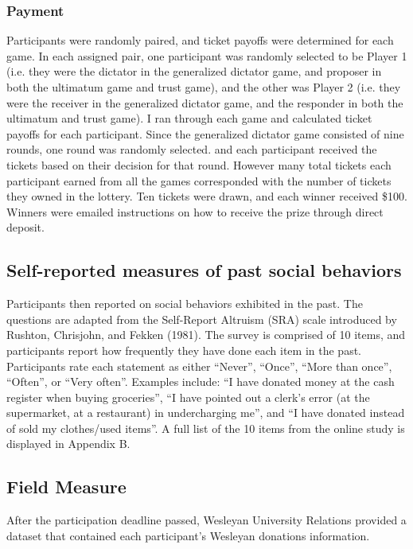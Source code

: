 \documentclass[12pt]{article}
\begin{document}
\subsubsection{Payment}

Participants were randomly paired, and ticket payoffs were determined for each game. In each assigned pair, one participant was randomly selected to be Player 1 (i.e. they were the dictator in the generalized dictator game, and proposer in both the ultimatum game and trust game), and the other was Player 2 (i.e. they were the receiver in the generalized dictator game, and the responder in both the ultimatum and trust game). I ran through each game and calculated ticket payoffs for each participant. Since the generalized dictator game consisted of nine rounds, one round was randomly selected. and each participant received the tickets based on their decision for that round. However many total tickets each participant earned from all the games corresponded with the number of tickets they owned in the lottery. Ten tickets were drawn, and each winner received \$100. Winners were emailed instructions on how to receive the prize through direct deposit.

\subsection{Self-reported measures of past social behaviors}

Participants then reported on social behaviors exhibited in the past. The questions are adapted from the Self-Report Altruism (SRA) scale introduced by Rushton, Chrisjohn, and Fekken (1981). The survey is comprised of 10 items, and participants report how frequently they have done each item in the past. Participants rate each statement as either ``Never'', ``Once'', ``More than once'', ``Often'', or ``Very often''. Examples include: ``I have donated money at the cash register when buying groceries'', ``I have pointed out a clerk\rq s error (at the supermarket, at a restaurant) in undercharging me'', and ``I have donated instead of sold my clothes/used items''. A full list of the 10 items from the online study is displayed in Appendix B. 

\subsection{Field Measure}

After the participation deadline passed, Wesleyan University Relations provided a dataset that contained each participant\rq s Wesleyan donations information.
\end{document}
